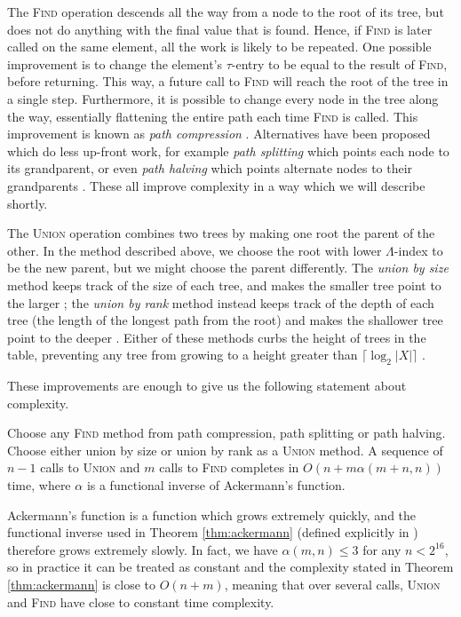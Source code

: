 The \textsc{Find} operation descends all the way from a node to the root of its
tree, but does not do anything with the final value that is found.  Hence, if
\textsc{Find} is later called on the same element, all the work is likely to be
repeated.  One possible improvement is to change the element's $\tau$-entry to
be equal to the result of \textsc{Find}, before returning.  This way, a future
call to \textsc{Find} will reach the root of the tree in a single step.
Furthermore, it is possible to change every node in the tree along the way,
essentially flattening the entire path each time \textsc{Find} is called.  This
improvement is known as \textit{path compression} \cite{hopcroft_1973}.
Alternatives have been proposed which do less up-front work, for example
\textit{path splitting} which points each node to its grandparent, or even
\textit{path halving} which points alternate nodes to their grandparents
\cite{leeuwen_1977}.  These all improve complexity in a way which we will
describe shortly.

The \textsc{Union} operation combines two trees by making one root the parent of
the other.  In the method described above, we choose the root with lower $\Lambda$-index
to be the new parent, but we might choose the parent differently.  The
\textit{union by size} method keeps track of the size of each tree, and makes
the smaller tree point to the larger \cite{galil_1991}; the \textit{union by
  rank} method instead keeps track of the depth of each tree (the length of the
longest path from the root) and makes the shallower tree point to the deeper
\cite{tarjan_1984}.  Either of these methods curbs the height of trees in the
table, preventing any tree from growing to a height greater than
$\lceil\log_2 |X|\rceil$ \cite[Lemma 1.1.2]{galil_1991}.

These improvements are enough to give us the following statement about
complexity.

\begin{theorem}
  \label{thm:ackermann}
  Choose any \textsc{Find} method from path compression, path splitting or path
  halving.  Choose either union by size or union by rank as a \textsc{Union}
  method.  A sequence of $n-1$ calls to \textsc{Union} and $m$ calls to
  \textsc{Find} completes in $O(n + m\alpha(m+n, n))$ time, where $\alpha$ is
  a functional inverse of Ackermann's function.
\end{theorem}

Ackermann's function is a function which grows extremely quickly, and the
functional inverse used in Theorem \ref{thm:ackermann} (defined explicitly in
\cite{tarjan_1984}) therefore grows extremely slowly.  In fact, we have
$\alpha(m,n) \leq 3$ for any $n < 2^{16}$, so in practice it can be treated as
constant and the complexity stated in Theorem \ref{thm:ackermann} is close to
$O(n + m)$, meaning that over several calls, \textsc{Union} and \textsc{Find}
have close to constant time complexity.

